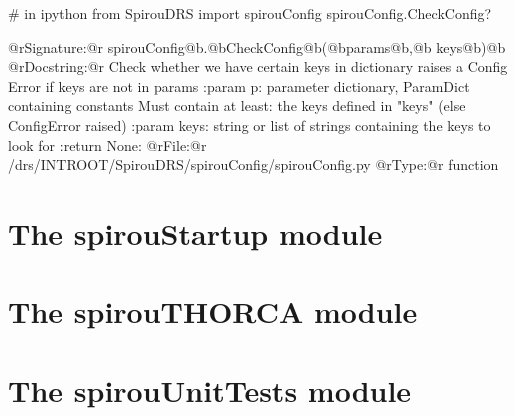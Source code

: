 \begin{minipage}{\textwidth}
\begin{pythonbox}
# in ipython
from SpirouDRS import spirouConfig
spirouConfig.CheckConfig?
\end{pythonbox}
\vspace{-0.25cm}
\begin{cmdboxprintspecial}
@rSignature:@r spirouConfig@b.@bCheckConfig@b(@bparams@b,@b keys@b)@b
@rDocstring:@r
Check whether we have certain keys in dictionary
raises a Config Error if keys are not in params
:param p: parameter dictionary, ParamDict containing constants
    Must contain at least:
        the keys defined in "keys" (else ConfigError raised)
:param keys: string or list of strings containing the keys to look for
:return None:
@rFile:@r      /drs/INTROOT/SpirouDRS/spirouConfig/spirouConfig.py
@rType:@r      function
\end{cmdboxprintspecial}
\end{minipage}





















\section{The spirouStartup module}
\label{ch:the_module:spirouStartup}


\section{The spirouTHORCA module}
\label{ch:the_module:spirouTHORCA}


\section{The spirouUnitTests module}
\label{ch:the_module:spirouUnitTests}
